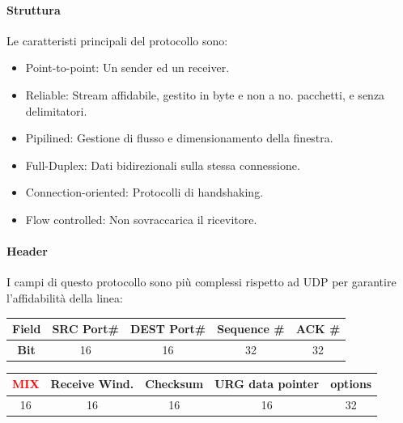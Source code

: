 \documentclass[12pt]{article}
\begin{document}
\paragraph{Struttura} Le caratteristi principali del protocollo sono:
\begin{itemize}
  \item Point-to-point: Un sender ed un receiver.
  \item Reliable: Stream affidabile, gestito in byte e non a no. pacchetti, e senza delimitatori.
  \item Pipilined: Gestione di flusso e dimensionamento della finestra.
  \item Full-Duplex: Dati bidirezionali sulla stessa connessione.
  \item Connection-oriented: Protocolli di handshaking.
  \item Flow controlled: Non sovraccarica il ricevitore.
\end{itemize}

\paragraph{Header} I campi di questo protocollo sono più complessi rispetto ad UDP per garantire l'affidabilità della linea:
\begin{center}
\begin{tabular}{ |c||c|c|c|c| }
 \hline
 \textbf{Field} & SRC Port\# & DEST Port\# & Sequence \# & ACK \#\\
 \hline
 \hline
 \textbf{Bit} & 16 & 16 & 32 & 32 \\
 \hline
\end{tabular}
\end{center}
\begin{center}
\begin{tabular}{ |c|c|c|c|c| }
 \hline
 \textcolor{Red}{\textbf{MIX}} & Receive Wind. & Checksum & URG data pointer & options\\
 \hline
 \hline
 16 & 16 & 16 & 16 & 32 \\
 \hline
\end{tabular}
\end{center}
\end{document}
